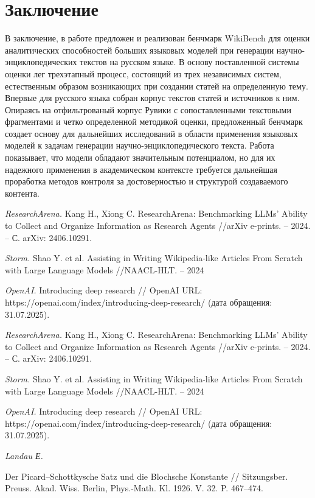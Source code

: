 \documentclass{article}
\theoremstyle{definition}
\theoremstyle{plain}
\begin{document}
\section*{Заключение}
В заключение, в работе предложен и реализован бенчмарк WikiBench для оценки аналитических способностей больших языковых моделей при генерации научно-энциклопедических текстов на русском языке.
В основу поставленной системы оценки лег трехэтапный процесс, состоящий из трех независимых систем, естественным образом возникающих при создании статей на определенную тему.
Впервые для русского языка собран корпус текстов статей и источников к ним. Опираясь на отфильтрованый корпус Рувики с сопоставленными текстовыми фрагментами и четко определенной методикой оценки, 
предложенный бенчмарк создает основу для дальнейших исследований в области применения языковых моделей к задачам генерации научно-энциклопедического текста. Работа показывает, что модели обладают значительным потенциалом, 
но для их надежного применения в академическом контексте требуется дальнейшая проработка методов контроля за достоверностью и структурой создаваемого контента.


\begin{thebibliography}{99}

\textit{ResearchArena.}
Kang H., Xiong C. ResearchArena: Benchmarking LLMs' Ability to Collect and Organize Information as Research Agents //arXiv e-prints. – 2024. – С. arXiv: 2406.10291.

\textit{Storm.}
Shao Y. et al. Assisting in Writing Wikipedia-like Articles From Scratch with Large Language Models //NAACL-HLT. – 2024

\textit{OpenAI.}
Introducing deep research // OpenAI URL: https://openai.com/index/introducing-deep-research/ (дата обращения: 31.07.2025).

\end{thebibliography}

\renewcommand\refname{References}



\begin{thebibliography}{99}

\textit{ResearchArena.}
Kang H., Xiong C. ResearchArena: Benchmarking LLMs' Ability to Collect and Organize Information as Research Agents //arXiv e-prints. – 2024. – С. arXiv: 2406.10291.

\textit{Storm.}
Shao Y. et al. Assisting in Writing Wikipedia-like Articles From Scratch with Large Language Models //NAACL-HLT. – 2024

\textit{OpenAI.}
Introducing deep research // OpenAI URL: https://openai.com/index/introducing-deep-research/ (дата обращения: 31.07.2025).

\textit{Landau Е.}

Der Picard--Schottkysche Satz und die Blochsche Konstante //
Sitzungsber. Preuss. Akad. Wiss. Berlin, Phys.-Math. Kl. 1926. V. 32. P. 467--474.

\end{thebibliography}
\end{document}
